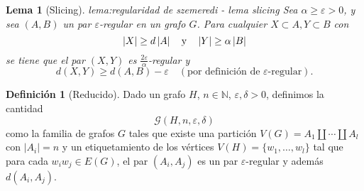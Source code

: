 \documentclass[12pt]{report}
\theoremstyle{plain}
\newtheorem{lemma}[theorem]{Lema}
\theoremstyle{definition}
\newtheorem{definition}[theorem]{Definición}
\newcommand{\naturals}{\mathbb{N}}
\newcommand{\abs}[1]{\left \vert #1 \right \vert}
\begin{document}
\begin{lemma}[Slicing]{lema:regularidad de szemeredi - lema slicing}
Sea $\alpha \geq \varepsilon > 0$, y sea $(A,B)$ un par $\varepsilon$-regular en un grafo $G$. Para cualquier $X \subset A, Y \subset B$ con
\[
    \abs X \geq d \abs A \quad \text y \quad \abs Y \geq \alpha \abs B
\]
se tiene que el par $(X,Y)$ es $\frac{2 \varepsilon}{\alpha}$-regular y
\[
    d(X,Y) \geq d (A,B) - \varepsilon \quad (\text{por definición de $\varepsilon$-regular}).
\]

\end{lemma}

\begin{definition}[Reducido]
Dado un grafo $H$, $n \in \naturals$, $\varepsilon, \delta > 0$, definimos la cantidad
\[
    \mathcal G (H,n, \varepsilon, \delta)
\]
como la familia de grafos $G$ tales que existe una partición $V(G)  = A_1 \coprod \cdots \coprod A_l$ con $\abs{A_i} = n$ y un etiquetamiento de los vértices $V(H) = \{w_1, \ldots, w_l\}$ tal que para cada $w_i w_j \in E(G)$, el par $(A_i, A_j)$ es un par $\varepsilon$-regular y además $d(A_i, A_j)$.

\end{definition}
\end{document}
